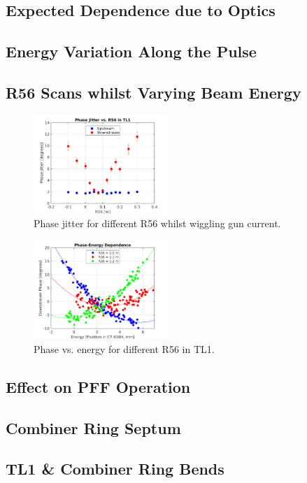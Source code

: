 \subsection{Expected Dependence due to Optics}
\label{ss:t566Sim}

\subsection{Energy Variation Along the Pulse}
\label{ss:energyAlongPulse}

\subsection{R56 Scans whilst Varying Beam Energy}
\label{ss:r56ScanWithEnergy}

\begin{figure}
  \centering
  \includegraphics[width=0.45\textwidth]{Figures/R56ScanGunWiggle_PhaseJitter}
  \caption{Phase jitter for different R56 whilst wiggling gun current.}
  \label{f:R56ScanGunWiggle_PhaseJitter}
\end{figure}

\begin{figure}
  \centering
  \includegraphics[width=0.45\textwidth]{Figures/R56ScanGunWiggle_Vs608}
  \caption{Phase vs. energy for different R56 in TL1.}
  \label{f:R56ScanGunWiggle_Vs608}
\end{figure}

\subsection{Effect on PFF Operation}
\label{ss:t566EffectPFF}



\subsection{Combiner Ring Septum}
\label{ss:crSeptum}

\subsection{TL1 \& Combiner Ring Bends}
\label{ss:crBends}








